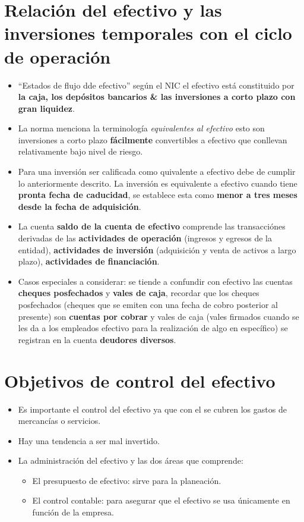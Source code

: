 \documentclass{article}
\begin{document}
\section{Relación del efectivo y las inversiones temporales con el ciclo de operación}
\begin{itemize}
    \item ``Estados de flujo dde efectivo'' según el NIC el efectivo está constituido por \textbf{la caja, los depósitos bancarios \& las inversiones a corto plazo con gran liquidez}.
    \item La norma menciona la terminología \emph{equivalentes al efectivo} esto son inversiones a corto plazo \textbf{fácilmente} convertibles a efectivo que conllevan relativamente bajo nivel de riesgo.
    \item Para una inversión ser calificada como quivalente a efectivo debe de cumplir lo anteriormente descrito. La inversión es equivalente a efectivo cuando tiene \textbf{pronta fecha de caducidad}, se establece esta como \textbf{menor a tres meses desde la fecha de adquisición}. 
    \item La cuenta \textbf{saldo de la cuenta de efectivo} comprende las transacciónes derivadas de las \textbf{actividades de operación} (ingresos y egresos de la entidad), \textbf{actividades de inversión} (adquisición y venta de activos a largo plazo), \textbf{actividades de financiación}.
    \item Casos especiales a considerar: se tiende a confundir con efectivo las cuentas \textbf{cheques posfechados} y \textbf{vales de caja}, recordar que los cheques posfechados (cheques que se emiten con una fecha de cobro posterior al presente) son \textbf{cuentas por cobrar} y vales de caja (vales firmados cuando se les da a los empleados efectivo para la realización de algo en específico) se registran en la cuenta \textbf{deudores diversos}. 
\end{itemize}


\section{Objetivos de control del efectivo}
\begin{itemize}
    \item Es importante el control del efectivo ya que con el se cubren los gastos de mercancías o servicios. 
    \item Hay una tendencia a ser mal invertido.
    \item La administración del efectivo y las dos áreas que comprende:
    \begin{itemize}
        \item El presupuesto de efectivo: sirve para la planeación.
        \item El control contable: para asegurar que el efectivo se usa únicamente en función de la empresa. 
    \end{itemize}
\end{itemize}
\end{document}
